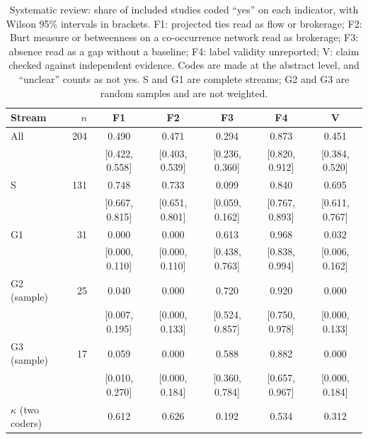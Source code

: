 \begin{table}[tbp]
  \centering
  \caption{Systematic review: share of included studies coded ``yes'' on each indicator, with Wilson 95\% intervals in brackets. F1: projected ties read as flow or brokerage; F2: Burt measure or betweenness on a co-occurrence network read as brokerage; F3: absence read as a gap without a baseline; F4: label validity unreported; V: claim checked against independent evidence. Codes are made at the abstract level, and ``unclear'' counts as not yes. S and G1 are complete streams; G2 and G3 are random samples and are not weighted.}
  \label{tab:review}
  \small
  \begin{tabular}{lrccccc}
    \toprule
    Stream & $n$ & F1 & F2 & F3 & F4 & V \\
    \midrule
    All & 204 & 0.490 & 0.471 & 0.294 & 0.873 & 0.451 \\
    & & {\scriptsize [0.422, 0.558]} & {\scriptsize [0.403, 0.539]} & {\scriptsize [0.236, 0.360]} & {\scriptsize [0.820, 0.912]} & {\scriptsize [0.384, 0.520]} \\[2pt]
    S & 131 & 0.748 & 0.733 & 0.099 & 0.840 & 0.695 \\
    & & {\scriptsize [0.667, 0.815]} & {\scriptsize [0.651, 0.801]} & {\scriptsize [0.059, 0.162]} & {\scriptsize [0.767, 0.893]} & {\scriptsize [0.611, 0.767]} \\[2pt]
    G1 & 31 & 0.000 & 0.000 & 0.613 & 0.968 & 0.032 \\
    & & {\scriptsize [0.000, 0.110]} & {\scriptsize [0.000, 0.110]} & {\scriptsize [0.438, 0.763]} & {\scriptsize [0.838, 0.994]} & {\scriptsize [0.006, 0.162]} \\[2pt]
    G2 (sample) & 25 & 0.040 & 0.000 & 0.720 & 0.920 & 0.000 \\
    & & {\scriptsize [0.007, 0.195]} & {\scriptsize [0.000, 0.133]} & {\scriptsize [0.524, 0.857]} & {\scriptsize [0.750, 0.978]} & {\scriptsize [0.000, 0.133]} \\[2pt]
    G3 (sample) & 17 & 0.059 & 0.000 & 0.588 & 0.882 & 0.000 \\
    & & {\scriptsize [0.010, 0.270]} & {\scriptsize [0.000, 0.184]} & {\scriptsize [0.360, 0.784]} & {\scriptsize [0.657, 0.967]} & {\scriptsize [0.000, 0.184]} \\
    \midrule
    $\kappa$ (two coders) & & 0.612 & 0.626 & 0.192 & 0.534 & 0.312 \\
    \bottomrule
  \end{tabular}
\end{table}

